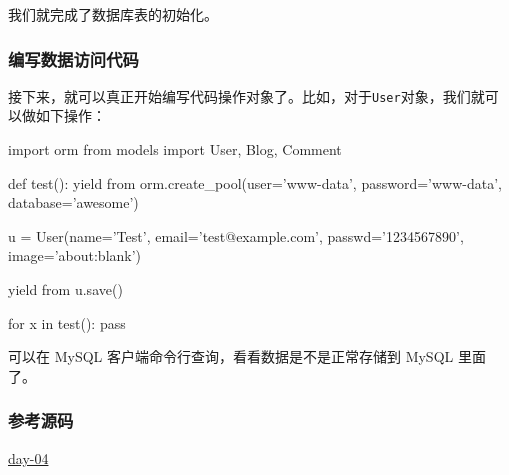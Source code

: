 
我们就完成了数据库表的初始化。

\hypertarget{ux7f16ux5199ux6570ux636eux8bbfux95eeux4ee3ux7801}{%
\subsubsection{编写数据访问代码}\label{ux7f16ux5199ux6570ux636eux8bbfux95eeux4ee3ux7801}}

接下来，就可以真正开始编写代码操作对象了。比如，对于\texttt{User}对象，我们就可以做如下操作：

\begin{pythoncode}
import orm
from models import User, Blog, Comment

def test():
    yield from orm.create_pool(user='www-data', password='www-data', database='awesome')

    u = User(name='Test', email='test@example.com', passwd='1234567890', image='about:blank')

    yield from u.save()

for x in test():
    pass
\end{pythoncode}

可以在 MySQL 客户端命令行查询，看看数据是不是正常存储到 MySQL 里面了。

\hypertarget{ux53c2ux8003ux6e90ux7801}{%
\subsubsection{参考源码}\label{ux53c2ux8003ux6e90ux7801}}

\href{https://github.com/michaelliao/awesome-python3-webapp/tree/day-04}{day-04}

